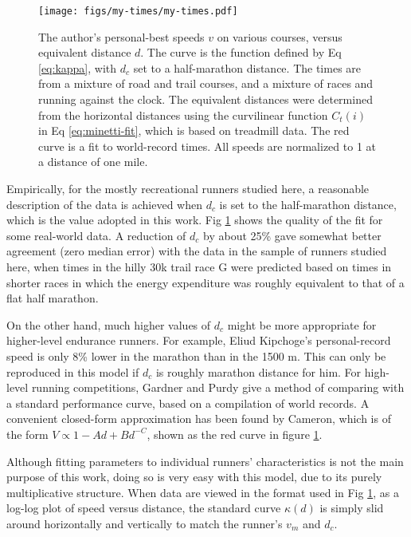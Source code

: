 \documentclass[10pt,letterpaper]{article}
\begin{document}
\begin{figure}[h]
\texttt{[image: figs/my-times/my-times.pdf]}
\centering
\caption{The author's personal-best speeds $v$ on various courses, versus equivalent distance $d$.
The curve is the function defined by Eq \ref{eq:kappa}, with $d_c$ set to a half-marathon distance.
The times are from a mixture of road and trail courses, and a mixture of races and running against the clock.
The equivalent distances were determined from the horizontal distances using the curvilinear
function $C_t(i)$ in Eq \ref{eq:minetti-fit}, which is based on treadmill data. The red curve is a 
fit to world-record times.\cite{cameron} All speeds are normalized to 1 at a distance of one mile.}
\label{fig:my-times}
\end{figure}

Empirically, for the mostly recreational runners studied here, a reasonable description of the data is achieved when
$d_c$ is set to the half-marathon distance, which is the value adopted in this work.
Fig \ref{fig:my-times} shows the quality of the fit for some real-world data.
A reduction of $d_c$ by about 25\% gave somewhat better agreement (zero median error) with the data in the sample of runners studied
here,  when times in the hilly 30k trail race G were
predicted based on times in shorter races in which the energy expenditure was roughly equivalent to that of
a flat half marathon.

On the other hand, much higher values of $d_c$ might be more appropriate for higher-level endurance runners.
For example, Eliud Kipchoge's personal-record
speed is only 8\% lower in the marathon than in the 1500 m. This can only be reproduced in this model if $d_c$
is roughly marathon distance for him.
For high-level running competitions, Gardner and Purdy give a
method of comparing with a standard performance curve, based on a compilation of world
records.\cite{gardner} A convenient closed-form approximation has been found by Cameron,\cite{cameron}
which is of the form $V\propto 1-Ad+Bd^{-C}$, shown as the red curve in figure \ref{fig:my-times}.

Although fitting parameters to individual runners' characteristics is not the main purpose of this work, doing
so is very easy with this model, due to its purely multiplicative structure.
When data are viewed in the format used in Fig \ref{fig:my-times}, as a log-log plot of speed versus distance,
the standard curve $\kappa(d)$ is simply slid around horizontally and vertically to match the runner's $v_m$ and $d_c$.
\end{document}
